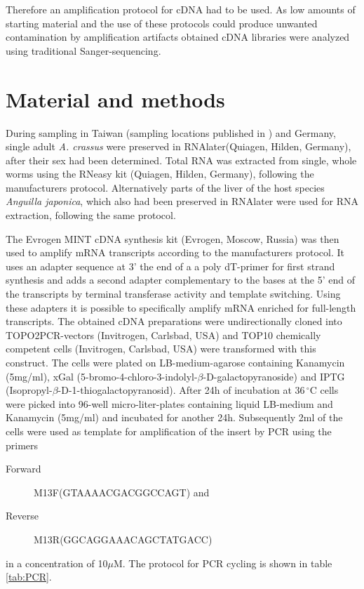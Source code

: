\documentclass[12pt,a4paper]{article}
\begin{document}
Therefore an amplification protocol for cDNA had to be used. As low
amounts of starting material and the use of these protocols could
produce unwanted contamination by amplification artifacts obtained
cDNA libraries were analyzed using traditional Sanger-sequencing.

\section*{Material and methods}

During sampling in Taiwan (sampling locations published in
\cite{heitlinger_massive_2009}) and Germany, single adult
\textit{A. crassus} were preserved in RNAlater(Quiagen, Hilden,
Germany), after their sex had been determined. Total RNA was extracted
from single, whole worms using the RNeasy kit (Quiagen, Hilden,
Germany), following the manufacturers protocol. Alternatively parts of
the liver of the host species \textit{Anguilla japonica}, which also
had been preserved in RNAlater were used for RNA extraction, following
the same protocol.

The Evrogen MINT cDNA synthesis kit (Evrogen, Moscow, Russia) was
then used to amplify mRNA transcripts according to the manufacturers
protocol. It uses an adapter sequence at 3' the end of a a poly
dT-primer for first strand synthesis and adds a second adapter
complementary to the bases at the 5' end of the transcripts by
terminal transferase activity and template switching. Using these
adapters it is possible to specifically amplify mRNA enriched for
full-length transcripts. The obtained cDNA preparations were
undirectionally cloned into TOPO2PCR-vectors (Invitrogen, Carlsbad,
USA) and TOP10 chemically competent cells (Invitrogen, Carlsbad, USA)
were transformed with this construct. The cells were plated on
LB-medium-agarose containing Kanamycin (5mg/ml), xGal
(5-bromo-4-chloro-3-indolyl-$\beta$-D-galactopyranoside) and IPTG
(Isopropyl-$\beta$-D-1-thiogalactopyranosid). After 24h of incubation
at $36\,^{\circ}\mathrm{C} $ cells were picked into 96-well
micro-liter-plates containing liquid LB-medium and Kanamycin (5mg/ml)
and incubated for another 24h. Subsequently 2ml of the cells were used
as template for amplification of the insert by PCR using the primers
\begin{description}
\item[Forward] M13F(GTAAAACGACGGCCAGT) and
\item[Reverse] M13R(GGCAGGAAACAGCTATGACC)
\end{description}
in a concentration of 10$\mu$M. The protocol for PCR cycling is shown
in table \ref{tab:PCR}.
\end{document}
